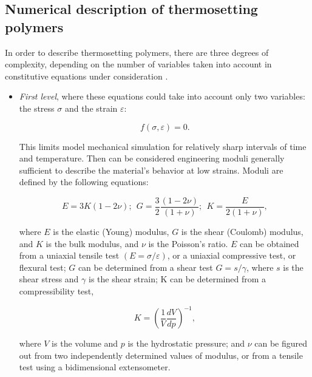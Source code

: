 \subsection{Numerical description of thermosetting polymers}
In order to describe thermosetting polymers, there are three degrees of complexity, depending on the number of variables taken into account in constitutive equations under consideration \cite{thermosetting_polymers}. 
\begin{itemize}
	
	\item 
	\textit{First level}, where these equations could take into account only two variables: the stress $\sigma$ and the strain $\varepsilon$:
	
	\begin{equation}\label{eq2:first_level}
		f(\sigma,\varepsilon)=0.
	\end{equation}
	
	This limits model mechanical simulation for relatively sharp intervals of time and temperature. Then can be considered engineering moduli generally sufficient to describe the material's behavior at low strains. Moduli are defined by the following equations:
	
	\begin{equation}\label{eq:basic_moduli}
		E = 3K(1-2\nu); ~~G=\dfrac{3}{2}\dfrac{(1-2\nu)}{(1+\nu)};~~ K=\frac{E}{2(1+\nu)},
	\end{equation}
	
	where $E$ is the elastic (Young) modulus, $G$ is the shear (Coulomb) modulus, and $K$ is the bulk modulus, and $\nu$ is the Poisson's ratio. $E$ can be obtained from a uniaxial tensile test $(E=\sigma/\varepsilon)$, or a uniaxial compressive test, or flexural test; $G$ can be determined from a shear test $G=s/\gamma$, where $s$ is the shear stress and $\gamma$ is the shear strain; K can be determined from a compressibility test, 
	
	\begin{equation}\label{eq:K_moduli}
		K=\left(\dfrac{1}{V}\dfrac{dV}{dp}\right)^{-1},
	\end{equation}
	
	where $V$ is the volume and $p$ is the hydrostatic pressure; and $\nu$ can be figured out from two independently determined values of modulus, or from a tensile test using a bidimensional extensometer. 
	

\end{itemize}
